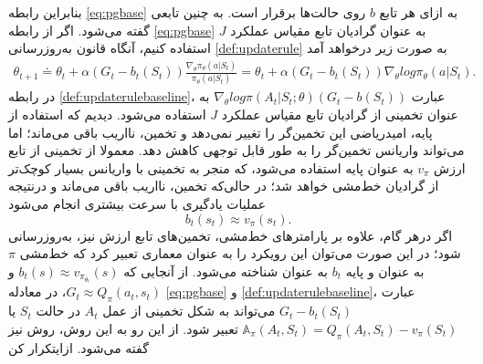 بنابراین رابطه 
\ref{eq:pgbase}
به ازای هر تابع $b$ روی حالت‌ها برقرار است. به چنین تابعی 
\textit{}
 گفته می‌شود. اگر از رابطه
  \ref{eq:pgbase}
  به عنوان گرادیان تابع مقیاس عملکرد $J$ استفاده کنیم، آنگاه قانون به‌روزرسانی 
  \ref{def:updaterule}
  به صورت زیر درخواهد آمد
\begin{align}
\theta_{t+1} \doteq \theta_t + \alpha (G_t - b_t(S_t)) \frac{\nabla_\theta \pi_\theta (a|S_t)}{\pi_\theta (a|S_t)} = \theta_t + \alpha (G_t- b_t(S_t)) \nabla_\theta log \pi_\theta (a|S_t).
\label{def:updaterulebaseline}
\end{align}
در رابطه 
\ref{def:updaterulebaseline}،
عبارت 
$\nabla_\theta  log  \pi(A_t|S_t;\theta) (G_t - b(S_t))$
به عنوان تخمینی از گرادیان تابع مقیاس عملکرد $J$ استفاده می‌شود. دیدیم که استفاده از پایه، امیدریاضی این تخمین‌گر را  تغییر نمی‌دهد و تخمین، نااریب باقی می‌ماند؛ اما می‌تواند واریانس تخمین‌گر را به طور قابل توجهی کاهش دهد. معمولا از تخمینی از تابع ارزش $v_\pi$ به عنوان پایه استفاده می‌شود،
که منجر به تخمینی با واریانس بسیار کوچک‌تر از گرادیان خط‌مشی خواهد شد؛ در حالی‌که تخمین، نااریب باقی می‌ماند و درنتیجه عملیات یادگیری با سرعت بیشتری انجام می‌شود
$$b_t(s_t) \approx v_\pi (s_t).$$
اگر درهر گام، علاوه بر پارامترهای خط‌مشی، تخمین‌های تابع ارزش نیز، به‌روزرسانی شود؛  در این صورت می‌توان این رویکرد را به عنوان معماری 
\textit{}
 تعبیر کرد که خط‌مشی $\pi$  به عنوان  و پایه $b_t$ به عنوان   شناخته می‌شود.
از آنجایی که
$b_t(s) \approx v_{\pi_{\theta_t}}(s)$
و
$G_t \approx Q_\pi (a_t, s_t)$،
در معادله 
\ref{eq:pgbase} و
\ref{def:updaterulebaseline}،
عبارت
$G_t - b_t(S_t)$
می‌تواند به شکل تخمینی از
\textit{}
 عمل $A_t$ در حالت $S_t$ یا 
$\mathbb{A}_\pi(A_t,S_t)=Q_\pi(A_t,S_t)-v_\pi(S_t)$
 تعبیر شود. از این رو به این روش، روش 
\textit{
}
نیز گفته می‌شود.
‌ازای{تکرار کن}


